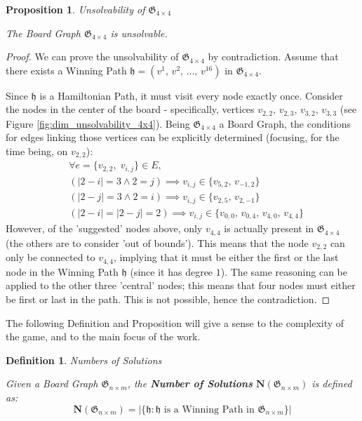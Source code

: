 \documentclass[conference]{IEEEtran}
\newtheorem{definition}{Definition}[section]
\newtheorem{proposition}{Proposition}[section]
\begin{document}
\begin{proposition}{Unsolvability of $\mathfrak{G}_{4 \times 4}$}{}
\label{prop:unsolvability_4x4}

The Board Graph $\mathfrak{G}_{4 \times 4}$ is unsolvable.
\end{proposition}
\begin{proof}
We can prove the unsolvability of $\mathfrak{G}_{4 \times 4}$ by contradiction. Assume that there exists a Winning Path $\mathfrak{h} = (v^1,\,v^2,\,\dots,\,v^{16})$ in $\mathfrak{G}_{4 \times 4}$. 

Since $\mathfrak{h}$ is a Hamiltonian Path, it must visit every node exactly once.
Consider the nodes in the center of the board - specifically, vertices $v_{2,2},\,v_{2,3},\,v_{3,2},\,v_{3,3}$ (see Figure \ref{fig:dim_unsolvability_4x4}).
Being $\mathfrak{G}_{4 \times 4}$ a Board Graph, the conditions for edges linking those vertices can be explicitly determined (focusing, for the time being, on $v_{2,2}$):
\begin{align*}
    &\forall e = \{v_{2,2},\;v_{i,j}\} \in E,\\
    &(|2 - i| = 3 \land 2 = j) \implies v_{i,j} \in \{v_{5,2},\,v_{-1,2}\}\\
    &(|2 - j| = 3 \land 2 = i) \implies v_{i,j} \in \{v_{2,5},\,v_{2,-1}\}\\
    &(|2 - i| = |2 - j| = 2) \implies v_{i,j} \in \{v_{0,0},\,v_{0,4},\,v_{4,0},\,v_{4,4}\}
\end{align*}
However, of the 'suggested' nodes above, only $v_{4,4}$ is actually present in $\mathfrak{G}_{4 \times 4}$ (the others are to consider 'out of bounds').
This means that the node $v_{2,2}$ can only be connected to $v_{4,4}$, implying that it must be either the first or the last node in the Winning Path $\mathfrak{h}$ (since it has degree $1$).
The same reasoning can be applied to the other three 'central' nodes; this means that four nodes must either be first or last in the path. This is not possible, hence the contradiction.

\end{proof}

The following Definition and Proposition will give a sense to the complexity of the game, and to the main focus of the work.

\begin{definition}{Numbers of Solutions}{}
\label{def:number_of_solutions}

Given a Board Graph $\mathfrak{G}_{n \times m}$, the \textbf{Number of Solutions} $\mathbf{N}(\mathfrak{G}_{n \times m})$ is defined as:
$$
    \mathbf{N}(\mathfrak{G}_{n \times m}) = |\{\mathfrak{h} : \mathfrak{h} \text{ is a Winning Path in } \mathfrak{G}_{n \times m}\}|
$$

\end{definition}
\end{document}
